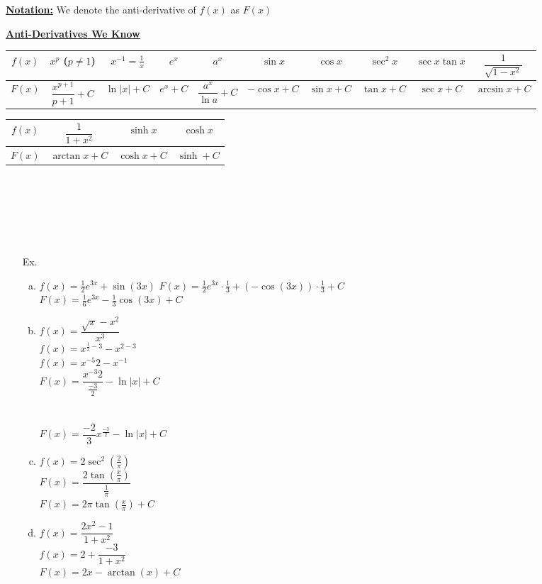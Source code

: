 \documentclass{letter}
\begin{document}
	\underline{\textbf{Notation:}} We denote the anti-derivative of $f(x)$ as $F(x)$
	
	\underline{\textbf{Anti-Derivatives We Know}}
	
	\begin{tabular}{c|c|c|c|c|c|c|c|c|c}
		$f(x)$&$x^p$ ($p \neq 1$)& $x^{-1} = \frac{1}{x}$&$e^x$&$a^x$&$\sin x$&$\cos x$&$\sec^2 x$&$\sec x \tan x$&$\dfrac{1}{\sqrt{1-x^2}}$\\
		\hline
		$F(x)$&$ \dfrac{x^{p+1}}{p+1} + C$&$\ln \vert x \vert + C$&$e^x + C$&$\dfrac{a^x}{\ln a} + C$&$-\cos x + C$&$\sin x + C$&$\tan x + C$&$\sec x + C$&$\arcsin x + C$
	\end{tabular}
	
	\begin{tabular}{c|c|c|c}
		$f(x)$&$\dfrac{1}{1+x^2}$&$\sinh x$&$\cosh x$\\
		\hline
		$F(x)$&$\arctan x + C$&$\cosh x + C$&$\sinh + C$\\
	\end{tabular}
	\\\\\\\\\\
	\begin{itemize}
		\item[Ex. ]
		\begin{enumerate}[a)]
			\item $f(x) = \frac{1}{2} e^{3x} + \sin(3x)$
			$F(x) = \frac12 e^{3x} \cdot \frac13 + (- \cos(3x)) \cdot \frac13 + C$\\
			$F(x) = \frac16 e^{3x} - \frac13 \cos(3x) + C$\\
			\item $f(x) = \dfrac{\sqrt{x} - x^2}{x^3}$\\
			$f(x) = x^{\frac12 - 3} - x^{2-3}$\\
			$f(x) = x^{-5}{2} - x^{-1}$\\
			$F(x) = \dfrac{x^{-3}{2}}{\frac{-3}{2}} - \ln \vert x \vert + C$\\\\\\
			$F(x) = \dfrac{-2}{3} x^{\frac{-3}{2}} - \ln \vert x \vert + C$\\
			\item $f(x) = 2 \sec^2 (\frac{2}{\pi})$\\
			$F(x) = \dfrac{2 \tan(\frac{x}{\pi})}{\frac{1}{\pi}}$\\
			$F(x) = 2\pi \tan(\frac{x}{\pi}) + C$\\
			\item $f(x) = \dfrac{2x^2 - 1}{1+x^2}$\\
			$f(x) = 2 + \dfrac{-3}{1+x^2}$\\
			$F(x) = 2x - \arctan (x) + C$
		\end{enumerate} 
	\end{itemize}
\end{document}
